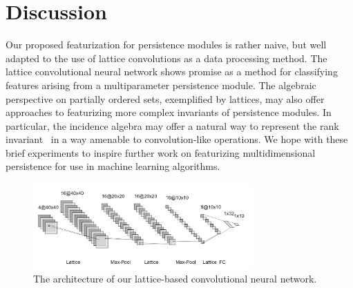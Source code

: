 \documentclass{article}
\begin{document}

\section{Discussion}

Our proposed featurization for persistence modules is rather naive, but well
adapted to the use of lattice convolutions as a data processing method. The
lattice convolutional neural network shows promise as a method for classifying
features arising from a multiparameter persistence module. The algebraic
perspective on partially ordered sets, exemplified by lattices, may also offer
approaches to featurizing more complex invariants of persistence modules. In
particular, the incidence algebra may offer a natural way to represent the rank
invariant~\cite{carlsson_theory_2009} in a way amenable to convolution-like
operations.
We hope with these brief experiments to inspire further work on featurizing
multidimensional persistence for use in machine learning algorithms.

\begin{figure}[h!]
  \caption{The architecture of our lattice-based convolutional neural network.}\label{fig:architecture}
    \begin{center}
    \includegraphics[width=0.75\textwidth]{nn.jpg}
    \end{center}
\end{figure}
\end{document}
